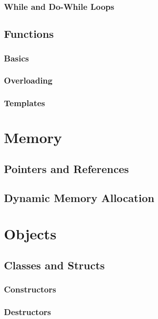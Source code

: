 \documentclass[11pt,fancy,authoryear]{elegantbook}
\begin{document}
\subsection{While and Do-While Loops}

\section{Functions}

\subsection{Basics}

\subsection{Overloading}

\subsection{Templates}

\chapter{Memory}

\section{Pointers and References}

\section{Dynamic Memory Allocation}

\chapter{Objects}

\section{Classes and Structs}

\subsection{Constructors}

\subsection{Destructors}
\end{document}
